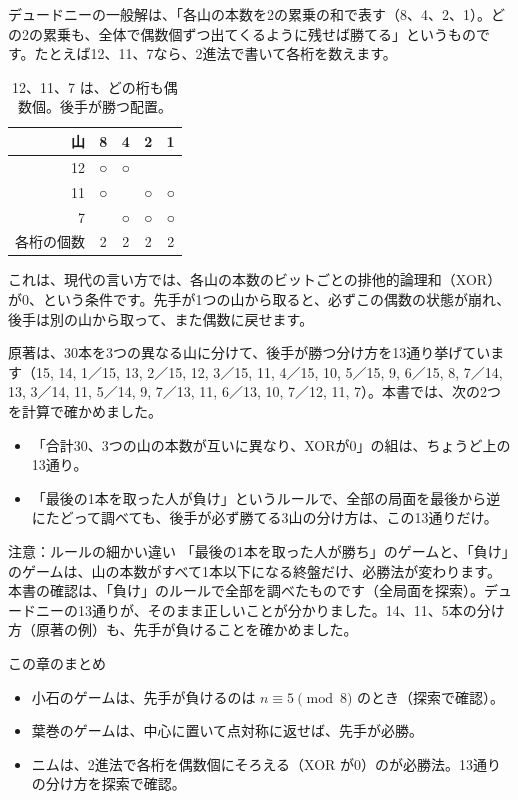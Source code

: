 \documentclass[a4paper,11pt,openany]{ltjsbook}
\begin{document}
デュードニーの一般解は、「各山の本数を2の累乗の和で表す（8、4、2、1）。どの2の累乗も、全体で偶数個ずつ出てくるように残せば勝てる」というものです。たとえば12、11、7なら、2進法で書いて各桁を数えます。

\begin{table}[htbp]
\centering
\begin{tabular}{r|cccc}
\toprule
山 & 8 & 4 & 2 & 1\\
\midrule
12 & ○ & ○ & & \\
11 & ○ & & ○ & ○\\
7 & & ○ & ○ & ○\\
\midrule
各桁の個数 & 2 & 2 & 2 & 2\\
\bottomrule
\end{tabular}
\caption{12、11、7 は、どの桁も偶数個。後手が勝つ配置。}
\end{table}

これは、現代の言い方では、各山の本数のビットごとの排他的論理和（XOR）が0、という条件です。先手が1つの山から取ると、必ずこの偶数の状態が崩れ、後手は別の山から取って、また偶数に戻せます。

原著は、30本を3つの異なる山に分けて、後手が勝つ分け方を13通り挙げています（15, 14, 1／15, 13, 2／15, 12, 3／15, 11, 4／15, 10, 5／15, 9, 6／15, 8, 7／14, 13, 3／14, 11, 5／14, 9, 7／13, 11, 6／13, 10, 7／12, 11, 7）。本書では、次の2つを計算で確かめました。

\begin{itemize}[leftmargin=*]
\item 「合計30、3つの山の本数が互いに異なり、XORが0」の組は、ちょうど上の13通り。
\item 「最後の1本を取った人が負け」というルールで、全部の局面を最後から逆にたどって調べても、後手が必ず勝てる3山の分け方は、この13通りだけ。
\end{itemize}

\begin{notebox}{注意：ルールの細かい違い}
「最後の1本を取った人が勝ち」のゲームと、「負け」のゲームは、山の本数がすべて1本以下になる終盤だけ、必勝法が変わります。本書の確認は、「負け」のルールで全部を調べたものです（全局面を探索）。デュードニーの13通りが、そのまま正しいことが分かりました。14、11、5本の分け方（原著の例）も、先手が負けることを確かめました。
\end{notebox}

\begin{pointbox}{この章のまとめ}
\begin{itemize}[leftmargin=*]
\item 小石のゲームは、先手が負けるのは $n\equiv5\pmod8$ のとき（探索で確認）。
\item 葉巻のゲームは、中心に置いて点対称に返せば、先手が必勝。
\item ニムは、2進法で各桁を偶数個にそろえる（XOR が0）のが必勝法。13通りの分け方を探索で確認。
\end{itemize}
\end{pointbox}
\end{document}
